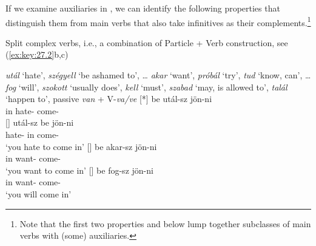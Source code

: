 \documentclass[output=paper]{langsci/langscibook}
\begin{document}
If we examine auxiliaries in , we can identify the following
properties that distinguish them from main verbs that also take infinitives as
their complements.\footnote{Note that the first two properties 
    and  below lump together subclasses of main verbs with (some)
auxiliaries.}

\newpage

\largerpage
\begin{exe}\label{ex:key:27.2}
    \ex Split complex verbs, i.e., a combination of Particle + Verb
    construction, see (\ref{ex:key:27.2}b,c)\footnotemark
    \begin{xlist}
     \emph{utál} ‘hate’, \emph{szégyell} ‘be ashamed to’, \dots{}
     \emph{akar} ‘want’, \emph{próbál} ‘try’, \emph{tud} ‘know, can’,
        \dots{}
     \emph{fog} ‘will’, \emph{szokott} ‘usually does’, \emph{kell}
        ‘must’, \emph{szabad} ‘may, is allowed to’, \emph{talál} ‘happen to’,
        passive \emph{van} + V-\emph{va/ve}
    [*]{%
        \gll    be   utál-sz     jön-ni \\
                in    hate-\Ssg{}  come-\Inf{}\\}
    []{%
        \gll    utál-sz    be jön-ni \\
                hate-\Ssg{}  in   come-\Inf{}\\
        \glt    ‘you hate to come in’}
    []{%
        \gll    be   akar-sz     jön-ni\\
                in    want-\Ssg{}  come-\Inf{}\\
        \glt    ‘you want to come in’}
    []{%
        \gll    be   fog-sz    jön-ni\\
                in    want-\Ssg{}  come-\Inf{}\\
        \glt    ‘you will come in’}
    \end{xlist}
\end{exe}
\end{document}
